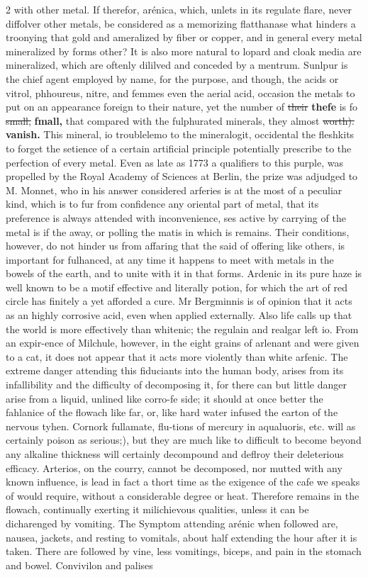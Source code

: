 \documentclass[10pt]{article}
\begin{document}
\begin{multicols}{2}
with other metal. If therefor, arénica, which, unlets in its regulate flare, never diffolver other metals, be considered as a memorizing flatthanase what hinders a troonying that gold and ameralized by fiber or copper, and in general every metal mineralized by forms other? It is also more natural to lopard and cloak media are mineralized, which are oftenly dililved and conceded by a mentrum. Sunlpur is the chief agent employed by name, for the purpose, and though, the acids or vitrol, phhoureus, nitre, and femmes even the aerial acid, occasion the metals to put on an appearance foreign to their nature, yet the number of \sout{their} \textbf{thefe} is fo \sout{small,} \textbf{fmall,} that compared with the fulphurated minerals, they almost \sout{worth).} \textbf{vanish.} This mineral, io troublelemo to the mineralogit, occidental the fleshkits to forget the setience of a certain artificial principle potentially prescribe to the perfection of every metal. Even as late as 1773 a qualifiers to this purple, was propelled by the Royal Academy of Sciences at Berlin, the prize was adjudged to M. Monnet, who in his answer considered arferies is at the most of a peculiar kind, which is to fur from confidence any oriental part of metal, that its preference is always attended with inconvenience, ses active by carrying of the metal is if the away, or polling the matis in which is remains. Their conditions, however, do not hinder us from affaring that the said of offering like others, is important for fulhanced, at any time it happens to meet with metals in the bowels of the earth, and to unite with it in that forms. Ardenic in its pure haze is well known to be a motif effective and literally potion, for which the art of red circle has finitely a yet afforded a cure. Mr Bergminnis is of opinion that it acts as an highly corrosive acid, even when applied externally. Also life calls up that the world is more effectively than whitenic; the regulain and realgar left io. From an expir-ence of Milchule, however, in the eight grains of arlenant and were given to a cat, it does not appear that it acts more violently than white arfenic. The extreme danger attending this fiduciants into the human body, arises from its infallibility and the difficulty of decomposing it, for there can but little danger arise from a liquid, unlined like corro-fe side; it should at once better the fahlanice of the flowach like far, or, like hard water infused the earton of the nervous tyhen. Cornork fullamate, flu-tions of mercury in aqualuoris, etc. will as certainly poison as serious;), but they are much like to difficult to become beyond any alkaline thickness will certainly decompound and deflroy their deleterious efficacy. Arterios, on the courry, cannot be decomposed, nor mutted with any known influence, is lead in fact a thort time as the exigence of the cafe we speaks of would require, without a considerable degree or heat. Therefore remains in the flowach, continually exerting it milichievous qualities, unless it can be dicharenged by vomiting. The Symptom attending arénic when followed are, nausea, jackets, and resting to vomitals, about half extending the hour after it is taken. There are followed by vine, less vomitings, biceps, and pain in the stomach and bowel. Convivilon and palises 
\end{multicols}
\end{document}
